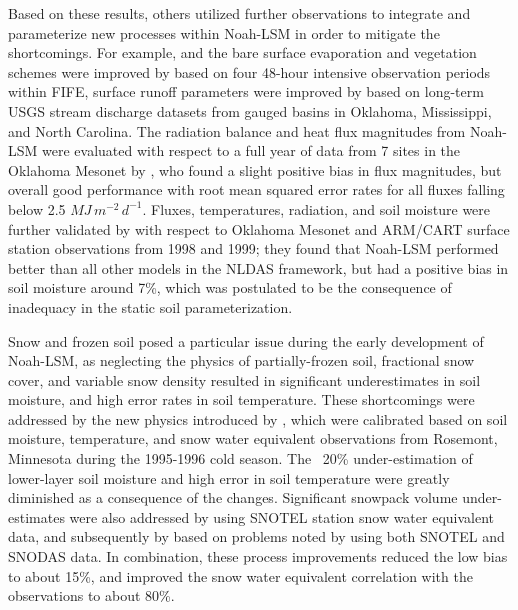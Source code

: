 Based on these results, others utilized further observations to integrate and parameterize new processes within Noah-LSM in order to mitigate the shortcomings. For example, and the bare surface evaporation and vegetation schemes were improved by \parencite{betts_assessment_1997} based on four 48-hour intensive observation periods within FIFE, surface runoff parameters were improved by \parencite{schaake_simple_1996} based on long-term USGS stream discharge datasets from gauged basins in Oklahoma, Mississippi, and North Carolina. The radiation balance and heat flux magnitudes from Noah-LSM were evaluated with respect to a full year of data from 7 sites in the Oklahoma Mesonet by \parencite{sridhar_validation_2002}, who found a slight positive bias in flux magnitudes, but overall good performance with root mean squared error rates for all fluxes falling below 2.5 $MJ\,m^{-2}\,d^{-1}$. Fluxes, temperatures, radiation, and soil moisture were further validated by \parencite{robock_evaluation_2003} with respect to Oklahoma Mesonet and ARM/CART surface station observations from 1998 and 1999; they found that Noah-LSM performed better than all other models in the NLDAS framework, but had a positive bias in soil moisture around 7\%, which was postulated to be the consequence of inadequacy in the static soil parameterization.

Snow and frozen soil posed a particular issue during the early development of Noah-LSM, as neglecting the physics of partially-frozen soil, fractional snow cover, and variable snow density resulted in significant underestimates in soil moisture, and high error rates in soil temperature. These shortcomings were addressed by the new physics introduced by \parencite{koren_parameterization_1999}, which were calibrated based on soil moisture, temperature, and snow water equivalent observations from Rosemont, Minnesota during the 1995-1996 cold season. The ~20\% under-estimation of lower-layer soil moisture and high error in soil temperature were greatly diminished as a consequence of the changes. Significant snowpack volume under-estimates were also addressed by \parencite{livneh_noah_2009} using SNOTEL station snow water equivalent data, and subsequently by \parencite{barlage_noah_2010} based on problems noted by \parencite{pan_snow_2003} using both SNOTEL and SNODAS data. In combination, these process improvements reduced the low bias to about 15\%, and improved the snow water equivalent correlation with the observations to about 80\%.

